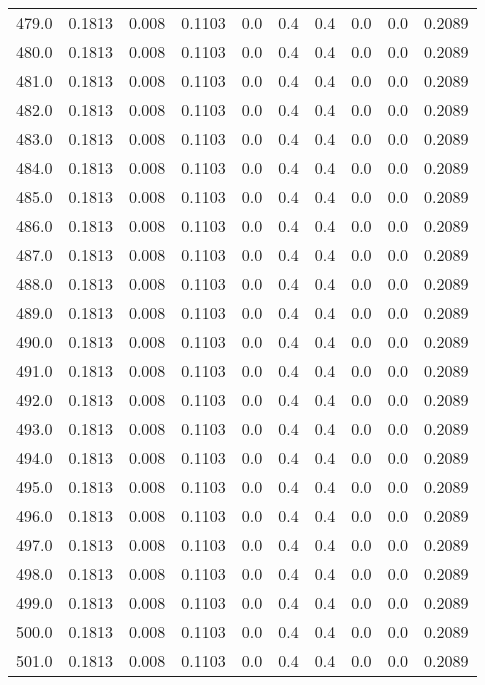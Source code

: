 \begin{longtable}{lrrrrrrrrr}
479.0 & 0.1813 & 0.008 & 0.1103 & 0.0 & 0.4 & 0.4 & 0.0 & 0.0 & 0.2089 \\
480.0 & 0.1813 & 0.008 & 0.1103 & 0.0 & 0.4 & 0.4 & 0.0 & 0.0 & 0.2089 \\
481.0 & 0.1813 & 0.008 & 0.1103 & 0.0 & 0.4 & 0.4 & 0.0 & 0.0 & 0.2089 \\
482.0 & 0.1813 & 0.008 & 0.1103 & 0.0 & 0.4 & 0.4 & 0.0 & 0.0 & 0.2089 \\
483.0 & 0.1813 & 0.008 & 0.1103 & 0.0 & 0.4 & 0.4 & 0.0 & 0.0 & 0.2089 \\
484.0 & 0.1813 & 0.008 & 0.1103 & 0.0 & 0.4 & 0.4 & 0.0 & 0.0 & 0.2089 \\
485.0 & 0.1813 & 0.008 & 0.1103 & 0.0 & 0.4 & 0.4 & 0.0 & 0.0 & 0.2089 \\
486.0 & 0.1813 & 0.008 & 0.1103 & 0.0 & 0.4 & 0.4 & 0.0 & 0.0 & 0.2089 \\
487.0 & 0.1813 & 0.008 & 0.1103 & 0.0 & 0.4 & 0.4 & 0.0 & 0.0 & 0.2089 \\
488.0 & 0.1813 & 0.008 & 0.1103 & 0.0 & 0.4 & 0.4 & 0.0 & 0.0 & 0.2089 \\
489.0 & 0.1813 & 0.008 & 0.1103 & 0.0 & 0.4 & 0.4 & 0.0 & 0.0 & 0.2089 \\
490.0 & 0.1813 & 0.008 & 0.1103 & 0.0 & 0.4 & 0.4 & 0.0 & 0.0 & 0.2089 \\
491.0 & 0.1813 & 0.008 & 0.1103 & 0.0 & 0.4 & 0.4 & 0.0 & 0.0 & 0.2089 \\
492.0 & 0.1813 & 0.008 & 0.1103 & 0.0 & 0.4 & 0.4 & 0.0 & 0.0 & 0.2089 \\
493.0 & 0.1813 & 0.008 & 0.1103 & 0.0 & 0.4 & 0.4 & 0.0 & 0.0 & 0.2089 \\
494.0 & 0.1813 & 0.008 & 0.1103 & 0.0 & 0.4 & 0.4 & 0.0 & 0.0 & 0.2089 \\
495.0 & 0.1813 & 0.008 & 0.1103 & 0.0 & 0.4 & 0.4 & 0.0 & 0.0 & 0.2089 \\
496.0 & 0.1813 & 0.008 & 0.1103 & 0.0 & 0.4 & 0.4 & 0.0 & 0.0 & 0.2089 \\
497.0 & 0.1813 & 0.008 & 0.1103 & 0.0 & 0.4 & 0.4 & 0.0 & 0.0 & 0.2089 \\
498.0 & 0.1813 & 0.008 & 0.1103 & 0.0 & 0.4 & 0.4 & 0.0 & 0.0 & 0.2089 \\
499.0 & 0.1813 & 0.008 & 0.1103 & 0.0 & 0.4 & 0.4 & 0.0 & 0.0 & 0.2089 \\
500.0 & 0.1813 & 0.008 & 0.1103 & 0.0 & 0.4 & 0.4 & 0.0 & 0.0 & 0.2089 \\
501.0 & 0.1813 & 0.008 & 0.1103 & 0.0 & 0.4 & 0.4 & 0.0 & 0.0 & 0.2089 \\

\end{longtable}
